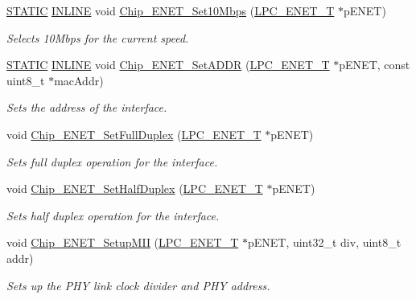 \begin{DoxyCompactItemize}
\hyperlink{group__LPC__Types__Public__Macros_ga10b2d890d871e1489bb02b7e70d9bdfb}{S\+T\+A\+T\+IC} \hyperlink{group__LPC__Types__Public__Types_ga2eb6f9e0395b47b8d5e3eeae4fe0c116}{I\+N\+L\+I\+NE} void \hyperlink{group__ENET__17XX__40XX_ga996dae6b7276fc708594ce239f40785f}{Chip\+\_\+\+E\+N\+E\+T\+\_\+\+Set10\+Mbps} (\hyperlink{structLPC__ENET__T}{L\+P\+C\+\_\+\+E\+N\+E\+T\+\_\+T} $\ast$p\+E\+N\+ET)
\begin{DoxyCompactList}\small\item\em Selects 10\+Mbps for the current speed. \end{DoxyCompactList}\item 
\hyperlink{group__LPC__Types__Public__Macros_ga10b2d890d871e1489bb02b7e70d9bdfb}{S\+T\+A\+T\+IC} \hyperlink{group__LPC__Types__Public__Types_ga2eb6f9e0395b47b8d5e3eeae4fe0c116}{I\+N\+L\+I\+NE} void \hyperlink{group__ENET__17XX__40XX_ga6d915db1de0ba98ac0cdb1df8c59515b}{Chip\+\_\+\+E\+N\+E\+T\+\_\+\+Set\+A\+D\+DR} (\hyperlink{structLPC__ENET__T}{L\+P\+C\+\_\+\+E\+N\+E\+T\+\_\+T} $\ast$p\+E\+N\+ET, const uint8\+\_\+t $\ast$mac\+Addr)
\begin{DoxyCompactList}\small\item\em Sets the address of the interface. \end{DoxyCompactList}\item 
void \hyperlink{group__ENET__17XX__40XX_ga0881ac9e0e98620c0e65f9a6d7a43240}{Chip\+\_\+\+E\+N\+E\+T\+\_\+\+Set\+Full\+Duplex} (\hyperlink{structLPC__ENET__T}{L\+P\+C\+\_\+\+E\+N\+E\+T\+\_\+T} $\ast$p\+E\+N\+ET)
\begin{DoxyCompactList}\small\item\em Sets full duplex operation for the interface. \end{DoxyCompactList}\item 
void \hyperlink{group__ENET__17XX__40XX_ga6d7031584471e30e89ded1fff5f3340d}{Chip\+\_\+\+E\+N\+E\+T\+\_\+\+Set\+Half\+Duplex} (\hyperlink{structLPC__ENET__T}{L\+P\+C\+\_\+\+E\+N\+E\+T\+\_\+T} $\ast$p\+E\+N\+ET)
\begin{DoxyCompactList}\small\item\em Sets half duplex operation for the interface. \end{DoxyCompactList}\item 
void \hyperlink{group__ENET__17XX__40XX_ga9694421dbd0f331895fcf514fd18c938}{Chip\+\_\+\+E\+N\+E\+T\+\_\+\+Setup\+M\+II} (\hyperlink{structLPC__ENET__T}{L\+P\+C\+\_\+\+E\+N\+E\+T\+\_\+T} $\ast$p\+E\+N\+ET, uint32\+\_\+t div, uint8\+\_\+t addr)
\begin{DoxyCompactList}\small\item\em Sets up the P\+HY link clock divider and P\+HY address. \end{DoxyCompactList}\item 

\end{DoxyCompactItemize}
